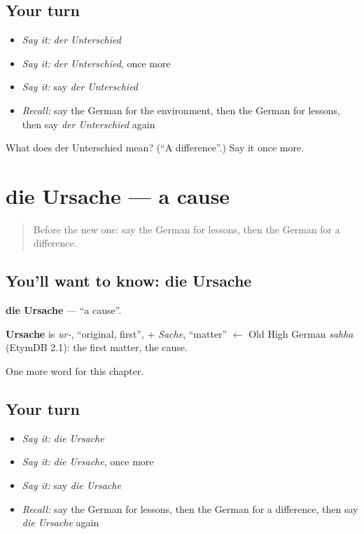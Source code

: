 \subsection*{Your turn}
\begin{itemize}
\raggedright
  \item \emph{Say it:} \emph{der Unterschied}
  \item \emph{Say it:} \emph{der Unterschied}, once more
  \item \emph{Say it:} say \emph{der Unterschied}
  \item \emph{Recall:} say the German for the environment, then the German for lessons, then say \emph{der Unterschied} again
\end{itemize}

\begin{tcolorbox}[breakable,colback=teal!4,colframe=teal!35!black,title={Before you move on}]
What does der Unterschied mean? (\textquotedblleft{}A difference\textquotedblright{}.) Say it once more.
\end{tcolorbox}
\section[die Ursache]{die Ursache — a cause}

\label{lesson:GE-C241-ursache}



\begin{quote}
Before the new one: say the German for lessons, then the German for a difference.
\end{quote}

\subsection*{You'll want to know: die Ursache}
\textbf{die Ursache} — \textquotedblleft{}a cause\textquotedblright{}.

\begin{cousinweb}
\textbf{Ursache} is \emph{ur-}, \textquotedblleft{}original, first\textquotedblright{}, + \emph{Sache}, \textquotedblleft{}matter\textquotedblright{} $\leftarrow$ Old High German \emph{sahha} (EtymDB 2.1): the first matter, the cause.
\end{cousinweb}

\begin{grammarlens}[title={What you've built}]
One more word for this chapter.
\end{grammarlens}

\subsection*{Your turn}
\begin{itemize}
\raggedright
  \item \emph{Say it:} \emph{die Ursache}
  \item \emph{Say it:} \emph{die Ursache}, once more
  \item \emph{Say it:} say \emph{die Ursache}
  \item \emph{Recall:} say the German for lessons, then the German for a difference, then say \emph{die Ursache} again
\end{itemize}

